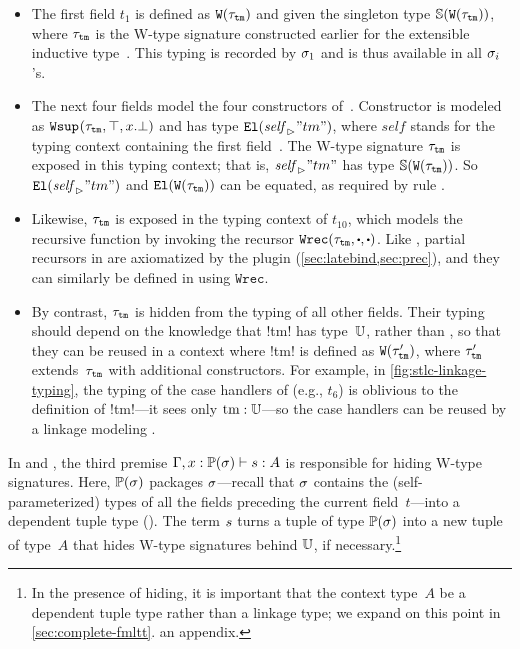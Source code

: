 \begin{itemize}
  [labelsep=*,leftmargin=1pc,itemsep=3pt]

\item 
The first field $t_1$ is defined as $\texttt{W}({\tau_{\texttt{tm}}})$
and given the singleton type $\mathbb{S}({\texttt{W}({\tau_{\texttt{tm}}})})$, where $\tau_{\texttt{tm}}$
is the W-type signature constructed earlier for the extensible inductive type~.
This typing is recorded by $\sigma_1$ and is thus available in all $\sigma_i$'s.

\item 
The next four fields model the four constructors of~.
Constructor  is modeled as $\texttt{Wsup}_{}({\tau_{\texttt{tm}}},{\top},{x.\bot})$
and has type $\texttt{El}({{\mathit{self}}_{\rhd}{"tm"}})$, where $\mathit{self}$ stands for
the typing context containing the first field~.
The W-type signature $\tau_{\texttt{tm}}$ is exposed in
this typing context; that is, ${\mathit{self}}_{\rhd}{"tm"}$ has type $\mathbb{S}({\texttt{W}({\tau_{\texttt{tm}}})})$.
So $\texttt{El}({{\mathit{self}}_{\rhd}{"tm"}})$ and $\texttt{El}({\texttt{W}({\tau_{\texttt{tm}}})})$ can be equated,
as required by rule .

\item
Likewise, $\tau_{\texttt{tm}}$ is exposed in the typing context of
$t_{10}$, which models the recursive function  by invoking
the recursor $\Wrec{\wsig_{\texttt{tm}}}{\cDot}{\cDot}$.
%
Like , partial recursors in \Lang are axiomatized by the plugin
(\cref{sec:latebind,sec:prec}), and they can similarly be defined in \TT
using $\texttt{Wrec}$.

\item
By contrast, $\tau_{\texttt{tm}}$ is hidden from the typing of all other fields.
Their typing should depend on the knowledge that \lsti!tm! has type~$\mathbb{U}$,
rather than ,
so that they can be reused in a context where
\lsti!tm! is defined as $\texttt{W}({\tau'_{\texttt{tm}}})$,
where $\tau'_{\texttt{tm}}$ extends~$\tau_{\texttt{tm}}$ with additional constructors.
%
For example, in \cref{fig:stlc-linkage-typing}, the typing of the case handlers of
 (e.g., $t_6$) is oblivious to the definition of \lsti!tm!---it sees only $\text{\lsti!tm!}:\cU$---so
the case handlers can be reused by a linkage modeling .

\end{itemize}

In  and ,
the third premise $ {\Gamma,x : \mathbb{P}({\sigma})} \vdash {\ensuremath{s}} : {A} $ is
responsible for hiding W-type signatures.
Here, $\mathbb{P}({\sigma})$ packages $\sigma$---recall that $\sigma$ contains the
(self-parameterized) types of all the fields preceding the current
field~$t$---into a dependent tuple type ().
The term $s$ turns a tuple of type $\mathbb{P}({\sigma})$ into a new tuple of type~$A$
that hides W-type signatures behind $\mathbb{U}$, if necessary.\footnote{%
In the presence of hiding, it is important that the context type~$A$ be a
dependent tuple type rather than a linkage type; we expand on this point in
\ifreport
\cref{sec:complete-fmltt}.
\else
an appendix.
\fi
}

